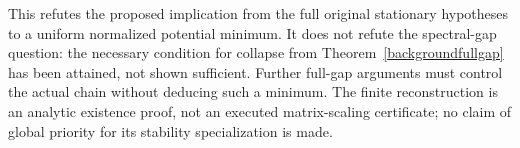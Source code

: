 This refutes the proposed implication from the full original stationary
hypotheses to a uniform normalized potential minimum. It does not
refute the spectral-gap question: the necessary condition for collapse
from Theorem~\ref{backgroundfullgap} has been attained, not shown
sufficient. Further full-gap arguments must control the actual chain
without deducing such a minimum. The finite reconstruction is an
analytic existence proof, not an executed matrix-scaling certificate;
no claim of global priority for its stability specialization is made.
